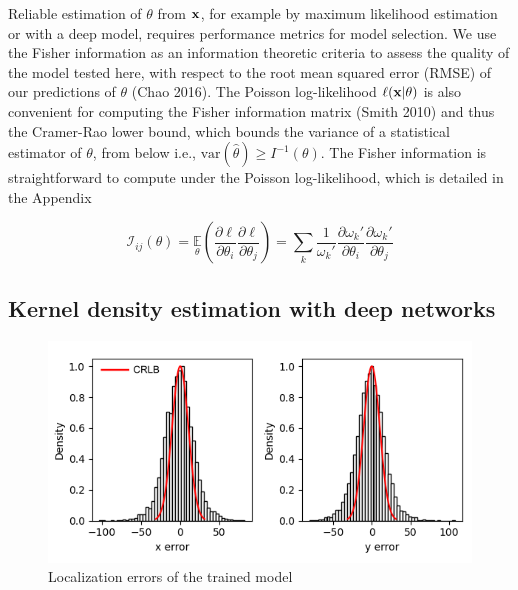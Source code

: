 \documentclass{article}
\begin{document}
Reliable estimation of $\theta$ from $\bold{x}$, for example by maximum likelihood estimation or with a deep model, requires performance metrics for model selection. We use the Fisher information as an information theoretic criteria to assess the quality of the model tested here, with respect to the root mean squared error (RMSE) of our predictions of $\theta$ (Chao 2016). The Poisson log-likelihood $\ell(\bold{x}|\theta)$ is also convenient for computing the Fisher information matrix (Smith 2010) and thus the Cramer-Rao lower bound, which bounds the variance of a statistical estimator of $\theta$, from below i.e., $\mathrm{var}(\hat{\theta}) \geq I^{-1}(\theta)$. The Fisher information is straightforward to compute under the Poisson log-likelihood, which is detailed in the Appendix

\begin{equation}
\mathcal{I}_{ij}(\theta) = \underset{\theta}{\mathbb{E}}\left(\frac{\partial \ell}{\partial\theta_{i}}\frac{\partial\ell}{\partial\theta_{j}}\right) = \sum_{k}\frac{1}{\omega_{k}'}\frac{\partial \omega_{k}'}{\partial\theta_{i}}\frac{\partial \omega_{k}'}{\partial\theta_{j}}
\end{equation}

\subsection{Kernel density estimation with deep networks}

\begin{figure}
\centering
\includegraphics[scale=0.7]{Errors.png}
\caption{Localization errors of the trained model}
\end{figure}
\end{document}

